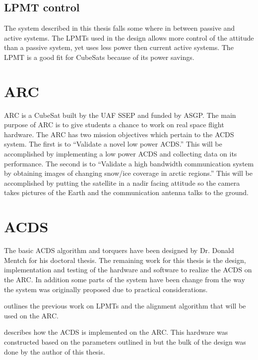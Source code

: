 \subsection{\acl{LPMT} control}

The system described in this thesis falls some where in between passive and active systems. The \acp{LPMT} used in the design allows more control of the attitude than a passive system, yet uses less power then current active systems. The \ac{LPMT} is a good fit for CubeSats because of its power savings.

\section{\acl{ARC}}

\ac{ARC} is a CubeSat built by the \ac{UAF} \ac{SSEP} and funded by \ac{ASGP}. The main purpose of \ac{ARC} is to give students a chance to work on real space flight hardware. The \ac{ARC} has two mission objectives which pertain to the \ac{ACDS} system. The first is to ``Validate a novel low power \ac{ACDS}.''\cite{ARCweb} This will be accomplished by implementing a low power \ac{ACDS} and collecting data on its performance. The second is to ``Validate a high bandwidth communication system by obtaining images of changing snow/ice coverage in arctic regions.''\cite{ARCweb} This will be accomplished by putting the satellite in a nadir facing attitude so the camera takes pictures of the Earth and the communication antenna talks to the ground.

\section{\acl{ACDS}}

The basic \ac{ACDS} algorithm and torquers have been designed by Dr. Donald Mentch for his doctoral thesis. The remaining work for this thesis is the design, implementation and testing of the hardware and software to realize the \ac{ACDS} on the \ac{ARC}. In addition some parts of the system have been change from the way the system was originally proposed due to practical considerations.

 outlines the previous work on \acp{LPMT} and the alignment algorithm that will be used on the \ac{ARC}.

 describes how the \ac{ACDS} is implemented on the \ac{ARC}. This hardware was constructed based on the parameters outlined in \cite{Mentch11} but the bulk of the design was done by the author of this thesis.


